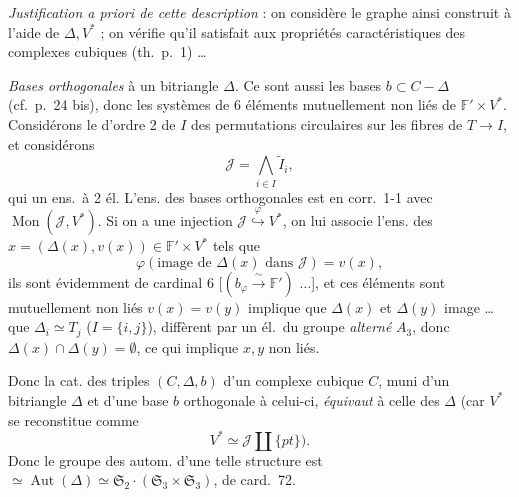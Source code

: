 \documentclass[11pt,a4paper]{article}
\begin{document}

\emph{Justification a priori de cette description} : on considère le
graphe ainsi construit à l'aide de $\Delta, V^{*}$ ; on vérifie qu'il
satisfait aux propriétés caractéristiques des complexes cubiques
(th.\ p.~1) \ldots
{}


\emph{Bases orthogonales} à un bitriangle $\Delta$. Ce sont aussi les bases
$b \subset C - \Delta$ (cf.\ p.~24 bis), donc les systèmes de 6 éléments
mutuellement non liés de $\mathbb{F}' \times V^{*}$. Considérons le
  d'ordre 2 de $I$ des permutations
circulaires sur les fibres de $T \to I$, et considérons
\[
\mathcal{J} = \bigwedge_{i \in I} \widetilde{I}_i ,
\]
qui  un ens.\ à 2 él. L'ens. des bases orthogonales est en
corr.\ 1-1 avec $\operatorname{Mon}(\mathcal{J}, V^{*})$. Si on a une
injection $\mathcal{J} \overset{\varphi}{\hookrightarrow} V^{*}$, on lui
associe l'ens.  des $x = (\Delta(x), v(x)) \in \mathbb{F}' \times V^{*}$
tels que
\[
\varphi(\text{image de } \Delta(x) \text{ dans } \mathcal{J}) = v(x) ,
\]
ils sont évidemment de cardinal 6 [$(b_{\varphi} \xrightarrow{\ \sim\ } \mathbb{F}')$
 $\ldots$], et ces éléments sont mutuellement non liés
 $v(x) = v(y)$ implique que $\Delta(x)$ et $\Delta(y)$
  image  \ldots{}  que $\Delta_i \simeq T_j$ ($I = \lbrace i, j \rbrace$), diffèrent
par un él.\ du groupe \emph{alterné} $A_3$, donc
$\Delta(x) \cap \Delta(y) = \emptyset$, ce qui implique $x, y$ non liés.


Donc la cat. des triples $(C, \Delta, b)$ d'un complexe cubique $C$, muni
d'un bitriangle $\Delta$ et d'une base $b$ orthogonale à celui-ci,
\emph{équivaut} à celle des $\Delta$ (car $V^{*}$ se reconstitue comme
\[
V^{*} \simeq \mathcal{J} \amalg \lbrace pt \rbrace ) .
\]
Donc le groupe des autom. d'une telle structure est
$\simeq \operatorname{Aut}(\Delta) \simeq \mathfrak{S}_2 \cdot (\mathfrak{S}_3 \times \mathfrak{S}_3)$,
de card.\ 72.
\end{document}
